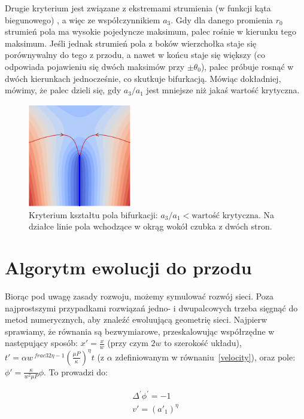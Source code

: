 \documentclass[]{pracamgr}
\begin{document}
      Drugie kryterium jest związane z ekstremami strumienia (w funkcji kąta biegunowego) \cite{petroff2013bifurcation, kaandorp2001algorithmic_Chapter4.4}, a więc ze współczynnikiem $a_3$. Gdy dla danego promienia $r_0$ strumień pola ma wysokie pojedyncze maksimum, palec rośnie w kierunku tego maksimum. Jeśli jednak strumień pola z boków wierzchołka staje się porównywalny do tego z przodu, a nawet w końcu staje się większy (co odpowiada pojawieniu się dwóch maksimów przy $\pm \theta_0$), palec próbuje rosnąć w dwóch kierunkach jednocześnie, co skutkuje bifurkacją. Mówiąc dokładniej, mówimy, że palec dzieli się, gdy $a_3/a_1$ jest mniejsze niż jakaś wartość krytyczna.

      \begin{figure}[H]
        \centering
        \includegraphics[width=0.4\textwidth]{figs/bifurcation_rule_a3.png}
        \caption{Kryterium kształtu pola bifurkacji: $a_3/a_1 < \textrm{wartość krytyczna} $. Na działce linie pola wchodzące w okrąg wokół czubka z dwóch stron.} 
        \label{bif_rule_a3}
      \end{figure}


    \section{Algorytm ewolucji do przodu}

      Biorąc pod uwagę zasady rozwoju, możemy symulować rozwój sieci. Poza najprostszymi przypadkami rozwiązań jedno- i dwupalcowych \cite{gubiec2008fingered} trzeba sięgnąć do metod numerycznych, aby znaleźć ewoluującą geometrię sieci. Najpierw sprawiamy, że równania są bezwymiarowe, przeskalowując współrzędne w następujący sposób: $x' = \frac{x}{w}$ (przy czym $2w$ to szerokość układu), $t' = \alpha w^{\ frac{3}{2}\eta-1} (\frac{\mu P}{\kappa})^{\eta} t$ (z $\alpha$ zdefiniowanym w równaniu~\ref{velocity}), oraz pole: $\phi' = \frac{\kappa}{w^2 \mu P}\phi$. To prowadzi do:
      
      \begin{gather}
        \label{rescaled_poisson} \Delta^\prime \phi^\prime = -1 \\ 
        \label{rescaled_vel} v' = (a'_1)^\eta
      \end{gather}
\end{document}
